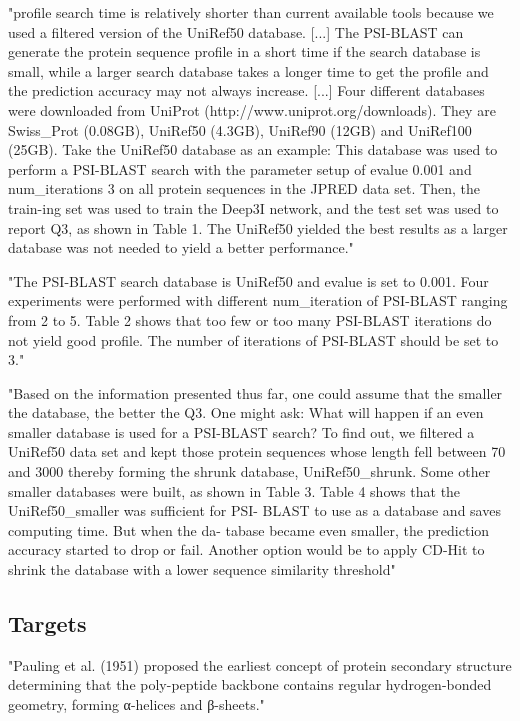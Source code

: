 \documentclass[]{scrartcl}
\begin{document}
"profile search time is relatively shorter than current available tools because we used a filtered version of the UniRef50 database. [...]
The PSI-BLAST can generate the protein sequence profile in a short time if the search database is small, while a larger search database takes a longer time to get the profile and the prediction accuracy may not always increase. [...] Four different databases were downloaded from UniProt
(http://www.uniprot.org/downloads). They are Swiss\_Prot (0.08GB), UniRef50 (4.3GB), UniRef90 (12GB) and UniRef100 (25GB). Take the UniRef50 database as an example: This database was used to perform a PSI-BLAST search with the parameter setup of evalue 0.001 and num\_iterations 3 on all protein sequences in the JPRED data set. Then, the train-ing set was used to train the Deep3I network, and the test set was used to report Q3, as shown in Table 1. The UniRef50 yielded the best results as a larger database was not needed to yield a better performance." \cite{Fang2017}

"The PSI-BLAST search database is UniRef50 and evalue is set to 0.001. Four experiments were performed with different num\_iteration of PSI-BLAST ranging from 2 to 5. Table 2 shows that too few or too many PSI-BLAST iterations do not yield good profile. The number of iterations of PSI-BLAST should be set to 3." \cite{Fang2017}

"Based on the information presented thus far, one could assume that the smaller the database, the better the Q3. One might ask: What will happen if an even smaller database is used for a PSI-BLAST search? To find out, we filtered a UniRef50 data set and kept those protein sequences whose length fell between 70 and 3000 thereby forming the shrunk database, UniRef50\_shrunk. Some other smaller databases were built, as shown in Table 3. Table 4 shows that the UniRef50\_smaller was sufficient for PSI- BLAST to use as a database and saves computing time. But when the da- tabase became even smaller, the prediction accuracy started to drop or fail. Another option would be to apply CD-Hit to shrink the database with a lower sequence similarity threshold" \cite{Fang2017}

\subsection{Targets}
"Pauling et al. (1951) proposed the earliest concept of protein secondary structure determining that the poly-peptide backbone contains regular hydrogen-bonded geometry, forming α-helices and β-sheets." \cite{Fang2017}
\end{document}

